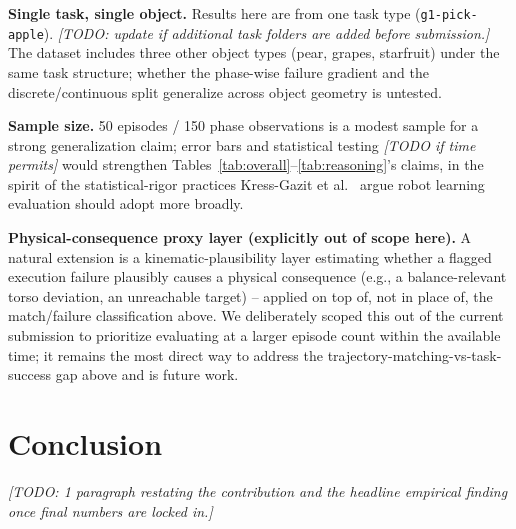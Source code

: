 \documentclass[conference]{IEEEtran}
\begin{document}
\textbf{Single task, single object.} Results here are from one task type
(\texttt{g1-pick-apple}). \textit{[TODO: update if additional task folders are added
before submission.]} The dataset includes three other object types (pear, grapes,
starfruit) under the same task structure; whether the phase-wise failure gradient and the
discrete/continuous split generalize across object geometry is untested.

\textbf{Sample size.} 50 episodes / 150 phase observations is a modest sample for a
strong generalization claim; error bars and statistical testing \textit{[TODO if time
permits]} would strengthen Tables~\ref{tab:overall}--\ref{tab:reasoning}'s claims, in the
spirit of the statistical-rigor practices Kress-Gazit et al.~\cite{kressgazit2024empirical}
argue robot learning evaluation should adopt more broadly.

\textbf{Physical-consequence proxy layer (explicitly out of scope here).} A natural
extension is a kinematic-plausibility layer estimating whether a flagged execution
failure plausibly causes a physical consequence (e.g., a balance-relevant torso
deviation, an unreachable target) -- applied on top of, not in place of, the
match/failure classification above. We deliberately scoped this out of the current
submission to prioritize evaluating at a larger episode count within the available time;
it remains the most direct way to address the trajectory-matching-vs-task-success gap
above and is future work.

\section{Conclusion}

\textit{[TODO: 1 paragraph restating the contribution and the headline empirical finding
once final numbers are locked in.]}



\end{document}
